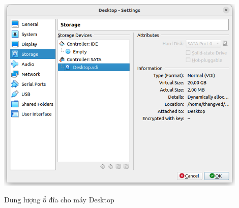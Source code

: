 \documentclass[a4paper, 11pt]{article}
\begin{document}
\begin{itemize}
\begin{enumerate}
                    \begin{minipage}
                        {\linewidth}
                        \captionsetup{type=figure}
                        \centering
                        \includegraphics[width=12cm]{images/desktop-disk.png}
                        \caption{Dung lượng ổ đĩa cho máy Desktop}
                        \label{desktop-disk}
                    \end{minipage}


\end{enumerate}
\end{itemize}
\end{document}
